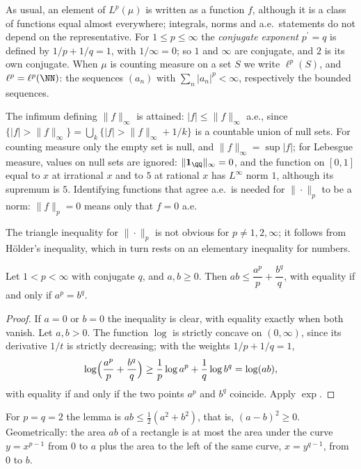 \begin{notation}\label{measure-theory:notation-lp}
As usual, an element of $L^p(\mu)$ is written as a function $f$, although it is a class of functions equal almost everywhere; integrals, norms and a.e.\ statements do not depend on the representative.
For $1 \leq p \leq \infty$ the \emph{conjugate exponent} $p^{\prime} = q$ is defined by $1/p + 1/q = 1$, with $1/\infty = 0$; so $1$ and $\infty$ are conjugate, and $2$ is its own conjugate. When $\mu$ is counting
measure on a set $S$ we write $\ell^p(S)$, and $\ell^p = \ell^p(\NN)$: the sequences $(a_n)$ with $\sum_n|a_n|^p < \infty$, respectively the bounded sequences.
\end{notation}

The infimum defining $\|f\|_\infty$ is attained: $|f| \leq \|f\|_\infty$ a.e., since $\{|f| > \|f\|_\infty\} = \bigcup_k\{|f| > \|f\|_\infty + 1/k\}$ is a countable union of null sets. For counting
measure only the empty set is null, and $\|f\|_\infty = \sup|f|$; for Lebesgue measure, values on null sets are ignored: $\|\mathbf{1}_\QQ\|_\infty = 0$, and the function on $[0, 1]$ equal to $x$ at irrational $x$ and to $5$ at
rational $x$ has $L^\infty$ norm $1$, although its supremum is $5$. Identifying functions that agree a.e.\ is needed for $\|\cdot\|_p$ to be a norm: $\|f\|_p = 0$
means only that $f = 0$ a.e.

The triangle inequality for $\|\cdot\|_p$ is not obvious for $p \neq 1, 2, \infty$; it follows from H\"older's inequality, which in turn rests on an elementary inequality for numbers.

\begin{lemma}\label{measure-theory:lemma-young-product}
Let $1 < p < \infty$ with conjugate $q$, and $a, b \geq 0$. Then $ab \leq \dfrac{a^p}{p} + \dfrac{b^q}{q}$, with equality if and only if $a^p = b^q$.
\end{lemma}

\begin{proof}
If $a = 0$ or $b = 0$ the inequality is clear, with equality exactly when both vanish. Let $a, b > 0$. The function $\log$ is strictly concave on $(0, \infty)$, since its derivative $1/t$ is strictly decreasing;
with the weights $1/p + 1/q = 1$,
\[
\log\Bigl(\frac{a^p}{p} + \frac{b^q}{q}\Bigr) \geq \frac1p\log a^p + \frac1q\log b^q = \log(ab),
\]
with equality if and only if the two points $a^p$ and $b^q$ coincide. Apply $\exp$.
\end{proof}

For $p = q = 2$ the lemma is $ab \leq \frac12(a^2 + b^2)$, that is, $(a - b)^2 \geq 0$. Geometrically: the area $ab$ of a rectangle is at most the area under the curve $y = x^{p-1}$ from $0$ to $a$ plus
the area to the left of the same curve, $x = y^{q-1}$, from $0$ to $b$.

